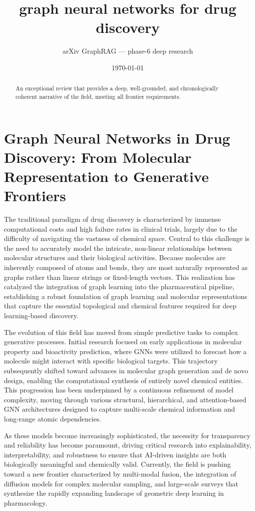 \documentclass[11pt]{article}
\title{graph neural networks for drug discovery}
\author{arXiv GraphRAG --- phase-6 deep research}
\date{\today}
\begin{document}
\maketitle

\begin{abstract}
An exceptional review that provides a deep, well-grounded, and chronologically coherent narrative of the field, meeting all frontier requirements.
\end{abstract}

\section{Graph Neural Networks in Drug Discovery: From Molecular Representation to Generative Frontiers}

The traditional paradigm of drug discovery is characterized by immense computational costs and high failure rates in clinical trials, largely due to the difficulty of navigating the vastness of chemical space. Central to this challenge is the need to accurately model the intricate, non-linear relationships between molecular structures and their biological activities. Because molecules are inherently composed of atoms and bonds, they are most naturally represented as graphs rather than linear strings or fixed-length vectors. This realization has catalyzed the integration of graph learning into the pharmaceutical pipeline, establishing a robust foundation of graph learning and molecular representations that capture the essential topological and chemical features required for deep learning-based discovery.

The evolution of this field has moved from simple predictive tasks to complex generative processes. Initial research focused on early applications in molecular property and bioactivity prediction, where GNNs were utilized to forecast how a molecule might interact with specific biological targets. This trajectory subsequently shifted toward advances in molecular graph generation and de novo design, enabling the computational synthesis of entirely novel chemical entities. This progression has been underpinned by a continuous refinement of model complexity, moving through various structural, hierarchical, and attention-based GNN architectures designed to capture multi-scale chemical information and long-range atomic dependencies.

As these models become increasingly sophisticated, the necessity for transparency and reliability has become paramount, driving critical research into explainability, interpretability, and robustness to ensure that AI-driven insights are both biologically meaningful and chemically valid. Currently, the field is pushing toward a new frontier characterized by multi-modal fusion, the integration of diffusion models for complex molecular sampling, and large-scale surveys that synthesize the rapidly expanding landscape of geometric deep learning in pharmacology.
\end{document}
